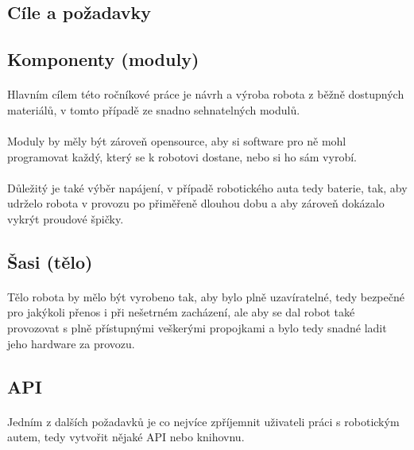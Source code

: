 \documentclass[12pt]{article}
\begin{document}
\begin{spacing}{1.5}
	\newpage
	\section{Cíle a požadavky}
	
	\subsection{Komponenty (moduly)}
	\paragraph{} Hlavním cílem této ročníkové práce je návrh a výroba robota z běžně dostupných materiálů, v tomto případě ze snadno sehnatelných modulů.
	\paragraph{} Moduly by měly být zároveň opensource, aby si software pro ně mohl programovat každý, který se k robotovi dostane, nebo si ho sám vyrobí.
	\paragraph{} Důležitý je také výběr napájení, v případě robotického auta tedy baterie, tak, aby udrželo robota v provozu po přiměřeně dlouhou dobu a aby zároveň dokázalo vykrýt proudové špičky.
	
	\subsection{Šasi (tělo)}
	\paragraph{} Tělo robota by mělo být vyrobeno tak, aby bylo plně uzavíratelné, tedy bezpečné pro jakýkoli přenos i při nešetrném zacházení, ale aby se dal robot také provozovat s plně přístupnými veškerými propojkami a bylo tedy snadné ladit jeho hardware za provozu.
	
	\subsection{API}
	\paragraph{} Jedním z dalších požadavků je co nejvíce zpříjemnit uživateli práci s robotickým autem, tedy vytvořit nějaké API nebo knihovnu.

\end{spacing}
\end{document}
